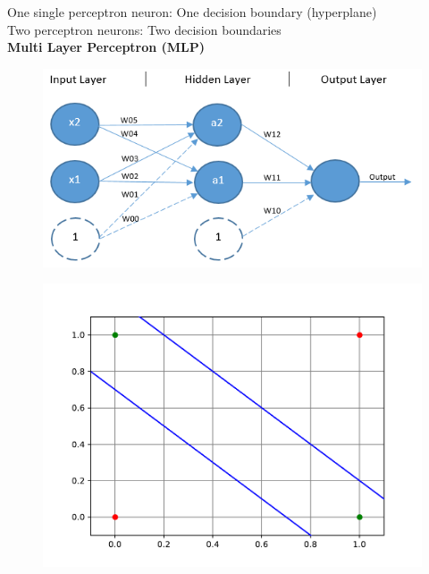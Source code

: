 \documentclass[10pt, compress]{beamer}
\begin{document}
\begin{frame}
  One single perceptron neuron: One decision boundary (hyperplane) \\
  Two perceptron neurons: Two decision boundaries \\
  \textbf{Multi Layer Perceptron (MLP)}

  \begin{multicols}{2}
    \begin{figure}
      \includegraphics[width=1.2\linewidth]{imgs/mlp_1}
    \end{figure}

    \columnbreak

    \hfill \break
    \begin{figure}
      \includegraphics[width=.7\linewidth]{imgs/xor_sep-eps-converted-to.pdf}
    \end{figure}
  \end{multicols}
\end{frame}
\end{document}
